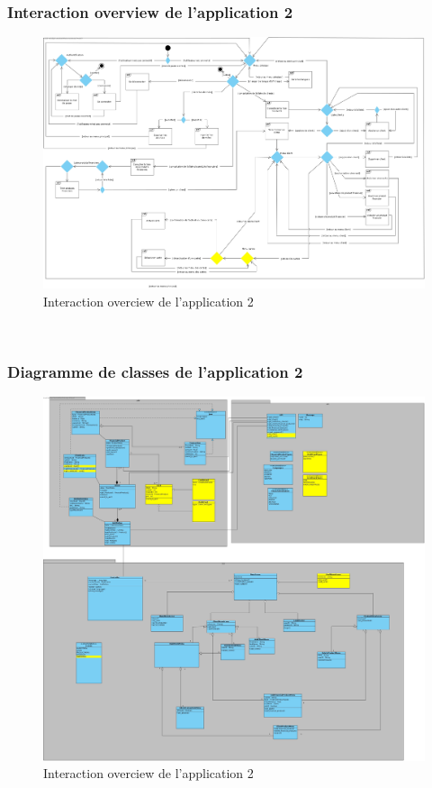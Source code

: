\documentclass[../rapport.tex]{subfiles}
\begin{document}
\subsubsection{Interaction overview de l'application 2}
	\begin{figure}[h!]
		\centering\includegraphics[scale=0.15]{ressources/photos_diagrammes/extensionTheo/diagrams2/interactionOverview2.jpg}
		\caption{Interaction overciew de l'application 2}
	\end{figure}\\
\subsubsection{Diagramme de classes de l'application 2}
	\begin{figure}[h!]
		\centering\includegraphics[scale=0.15]{ressources/photos_diagrammes/extensionTheo/diagrams2/classDiagram2.jpg}
		\caption{Interaction overciew de l'application 2}
	\end{figure}\\
\end{document}
